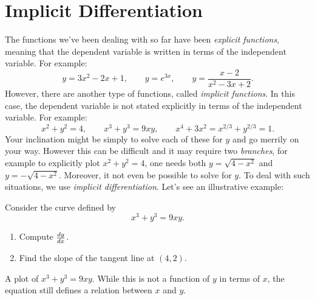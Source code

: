 \section{Implicit Differentiation}

The functions we've been dealing with so far have been
\textit{explicit functions}, meaning that the
dependent variable is written in terms of the independent variable. For
example:
\[
y=3x^2-2x+1,\qquad y=e^{3x}, \qquad y = \frac{x-2}{x^2-3x+2}.
\]
However, there are another type of functions, called \textit{implicit functions}. In this case, the dependent
variable is not stated explicitly in terms of the independent
variable. For example:
\[
x^2+y^2 = 4,\qquad x^3+y^3 = 9xy, \qquad x^4+3x^2 = x^{2/3}+y^{2/3} = 1.
\]
Your inclination might be simply to solve each of these for $y$ and go
merrily on your way. However this can be difficult and it may require
two \textit{branches}, for example to explicitly plot $x^2+y^2 = 4$,
one needs both $y= \sqrt{4-x^2}$ and $y=-\sqrt{4-x^2}$. Moreover, it not even be
possible to solve for $y$. To deal with such situations, we use
\textit{implicit differentiation}. Let's see an illustrative example:


\begin{example}
Consider the curve defined by
\[
x^3+y^3 = 9xy.
\]
\begin{enumerate}
\item Compute $\frac{dy}{dx}$.
\item Find the slope of the tangent line at $(4,2)$.
\end{enumerate}
\end{example}


\begin{marginfigure}
\caption{A plot of $x^3+y^3 = 9xy$. While this is not a function of
  $y$ in terms of $x$, the equation still defines a relation between
  $x$ and $y$.}
\end{marginfigure}

